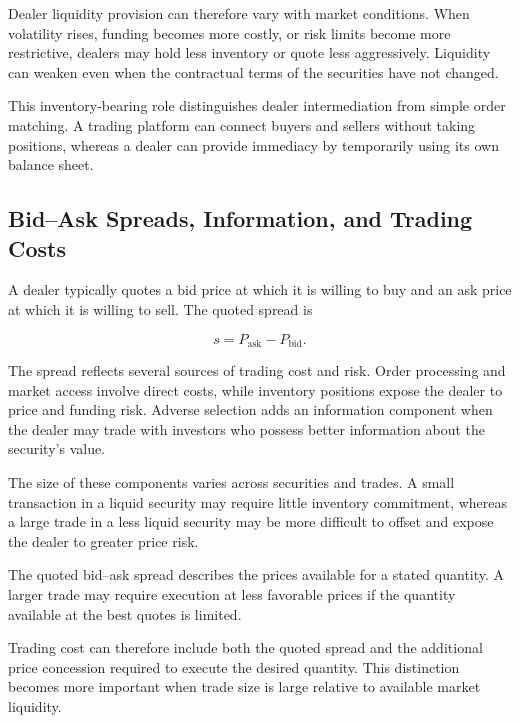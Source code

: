 Dealer liquidity provision can therefore vary with market conditions. When volatility rises, funding becomes more costly, or risk limits become more restrictive, dealers may hold less inventory or quote less aggressively. Liquidity can weaken even when the contractual terms of the securities have not changed.

This inventory-bearing role distinguishes dealer intermediation from simple order matching. A trading platform can connect buyers and sellers without taking positions, whereas a dealer can provide immediacy by temporarily using its own balance sheet.

\subsection[Bid--Ask Spreads, Information, and Trading Costs]
{Bid--Ask Spreads, Information, and Trading \\Costs}

A dealer typically quotes a bid price at which it is willing to buy and an ask price at which it is willing to sell. The quoted spread is

\begin{equation}
s=P_{\mathrm{ask}}-P_{\mathrm{bid}}.
\label{eq:ch13-dealer-spread}
\end{equation}

The spread reflects several sources of trading cost and risk. Order processing and market access involve direct costs, while inventory positions expose the dealer to price and funding risk. Adverse selection adds an information component when the dealer may trade with investors who possess better information about the security's value.

The size of these components varies across securities and trades. A small transaction in a liquid security may require little inventory commitment, whereas a large trade in a less liquid security may be more difficult to offset and expose the dealer to greater price risk.

\begin{tcolorbox}[
  enhanced,
  breakable,
  colback=white,
  colframe=FinanceBlue,
  boxrule=0.7pt,
  sharp corners,
  borderline west={2.2pt}{0pt}{FinanceBlue},
  title=\textbf{Financial Perspective: The Quoted Spread Is Not the Entire Trading Cost},
  coltitle=white,
  colbacktitle=FinanceBlue,
  fonttitle=\bfseries,
  before skip=1.2em,
  after skip=1.2em
]

The quoted bid--ask spread describes the prices available for a stated quantity. A larger trade may require execution at less favorable prices if the quantity available at the best quotes is limited.

Trading cost can therefore include both the quoted spread and the additional price concession required to execute the desired quantity. This distinction becomes more important when trade size is large relative to available market liquidity.

\end{tcolorbox}

